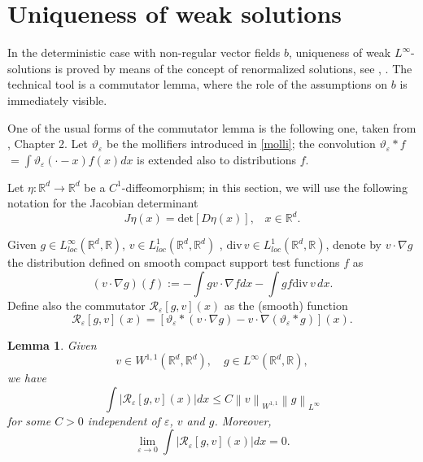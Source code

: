 \documentclass[a4paper,10pt]{article}
\newtheorem{lemma}[theorem]{Lemma}
\begin{document}
\section{Uniqueness of weak solutions}

In the deterministic case with non-regular vector fields $b$, uniqueness of
weak $L^{\infty}$-solutions is proved by means of the concept of renormalized
solutions, see \cite{DiPernaLions}, \cite{Ambrosio}. The technical tool is a
commutator lemma, where the role of the assumptions on $b$ is immediately visible.

One of the usual forms of the commutator lemma is the following
one, taken from \cite{Lions}, Chapter 2. Let
$\vartheta_{\varepsilon}$ be the mollifiers introduced in
\eqref{molli}; the convolution $\vartheta_{\varepsilon}\ast f$ $=
\int\vartheta _{\varepsilon}\left( \cdot-x\right) f\left( x\right)
dx$ is  extended also to
distributions $f$.

\vskip 1mm Let $\eta : \mathbb{R}^d \to \mathbb{R}^d$ be a
$C^1$-diffeomorphism; in this section, we will  use the
 following notation for the Jacobian determinant
$$
J \eta (x) = \text{det}[D \eta (x) ],\;\;\; x \in \mathbb{R}^d.
$$

Given $g\in L_{loc}^{\infty}\left(  \mathbb{R}%
^{d},\mathbb{R}\right)  $, $v\in L_{loc}^{1}\left(  \mathbb{R}^{d}%
,\mathbb{R}^{d}\right)  $ , $\mathrm{div}\,  v\in
L_{loc}^{1}\left( \mathbb{R}^{d},\mathbb{R}\right)  $, denote by
$v\cdot\nabla g$ the distribution defined on smooth compact
support test functions $f$ as
\[
\left(  v\cdot\nabla g\right)  \left(  f\right)  :=-\int
gv\cdot\nabla fdx-\int gf\mathrm{div}\,  v \, dx.
\]
Define also the commutator $\mathcal{R}_{\varepsilon}\left[  g,v\right]
\left(  x\right)  $ as the (smooth) function%
\[
\mathcal{R}_{\varepsilon}\left[  g,v\right]  \left(  x\right)  =\left[
\vartheta_{\varepsilon}\ast\left(  v\cdot\nabla g\right)  -v\cdot\nabla\left(
\vartheta_{\varepsilon}\ast g\right)  \right]  \left(  x\right)  .
\]

\begin{lemma}
Given
\[
v\in W^{1,1}\left(  \mathbb{R}^{d},\mathbb{R}^{d}\right)  ,\quad g\in
L^{\infty}\left(  \mathbb{R}^{d},\mathbb{R}\right)  ,
\]
we have
\[
\int\left|  \mathcal{R}_{\varepsilon}\left[  g,v\right]  \left(  x\right)
\right|  dx\leq C\left\|  v\right\|  _{W^{1,1}}\left\|  g\right\|
_{L^{\infty}}%
\]
for some $C>0$ independent of $\varepsilon$, $v$ and $g$. Moreover,
\[
\lim_{\varepsilon\rightarrow0}\int\left|  \mathcal{R}_{\varepsilon}\left[
g,v\right]  \left(  x\right)  \right|  dx=0.
\]
\end{lemma}
\end{document}
